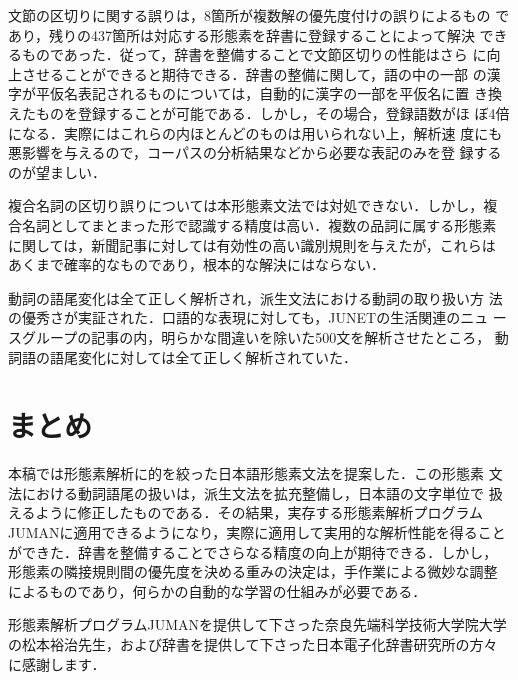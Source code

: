 文節の区切りに関する誤りは，8箇所が複数解の優先度付けの誤りによるもの
であり，残りの437箇所は対応する形態素を辞書に登録することによって解決
できるものであった．従って，辞書を整備することで文節区切りの性能はさら
に向上させることができると期待できる．辞書の整備に関して，語の中の一部
の漢字が平仮名表記されるものについては，自動的に漢字の一部を平仮名に置
き換えたものを登録することが可能である．しかし，その場合，登録語数がほ
ぼ4倍になる．実際にはこれらの内ほとんどのものは用いられない上，解析速
度にも悪影響を与えるので，コーパスの分析結果などから必要な表記のみを登
録するのが望ましい．

複合名詞の区切り誤りについては本形態素文法では対処できない．しかし，複
合名詞としてまとまった形で認識する精度は高い．複数の品詞に属する形態素
に関しては，新聞記事に対しては有効性の高い識別規則を与えたが，これらは
あくまで確率的なものであり，根本的な解決にはならない．

動詞の語尾変化は全て正しく解析され，派生文法における動詞の取り扱い方
法の優秀さが実証された．口語的な表現に対しても，JUNETの生活関連のニュ
ースグループの記事の内，明らかな間違いを除いた500文を解析させたところ，
動詞語の語尾変化に対しては全て正しく解析されていた．


\section{まとめ}
本稿では形態素解析に的を絞った日本語形態素文法を提案した．この形態素
文法における動詞語尾の扱いは，派生文法を拡充整備し，日本語の文字単位で
扱えるように修正したものである．その結果，実存する形態素解析プログラム
JUMANに適用できるようになり，実際に適用して実用的な解析性能を得ること
ができた．辞書を整備することでさらなる精度の向上が期待できる．しかし，
形態素の隣接規則間の優先度を決める重みの決定は，手作業による微妙な調整
によるものであり，何らかの自動的な学習の仕組みが必要である．



\acknowledgment

形態素解析プログラムJUMANを提供して下さった奈良先端科学技術大学院大学
の松本裕治先生，および辞書を提供して下さった日本電子化辞書研究所の方々
に感謝します．


